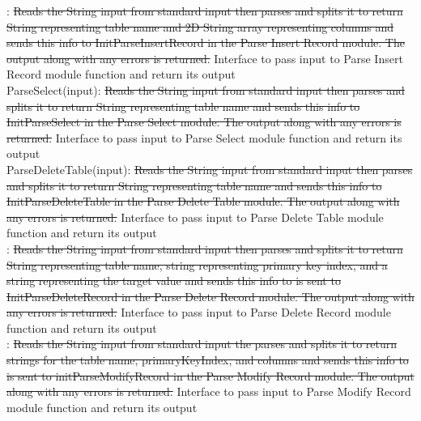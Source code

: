 \documentclass[12pt]{article}
\begin{document}
: \sout{Reads the String input from standard input then parses and splits it to return String representing table name and 2D String array representing columns and sends this info to InitParseInsertRecord in the Parse Insert Record module. The output along with any errors is returned.} {\color{red} Interface to pass input to Parse Insert Record module function and return its output}\\

\noindent ParseSelect(input): \sout{Reads the String input from standard input then parses and splits it to return String representing table name and sends this info to InitParseSelect in the Parse Select module. The output along with any errors is returned.} {\color{red} Interface to pass input to Parse Select module function and return its output}\\

\noindent ParseDeleteTable(input): \sout{Reads the String input from standard input then parses and splits it to return String representing table name and sends this info to InitParseDeleteTable in the Parse Delete Table module. The output along with any errors is returned.} {\color{red} Interface to pass input to Parse Delete Table module function and return its output}\\

: \sout{Reads the String input from standard input then parses and splits it to return String representing table name, string representing primary key index, and a string representing the target value and sends this info to is sent to InitParseDeleteRecord in the Parse Delete Record module. The output along with any errors is returned.} {\color{red} Interface to pass input to Parse Delete Record module function and return its output}\\ 

: \sout{Reads the String input from standard input the parses and splits it to return strings for the table name, primaryKeyIndex, and columns and sends this info to is sent to initParseModifyRecord in the Parse Modify Record module. The output along with any errors is returned.} {\color{red} Interface to pass input to Parse Modify Record module function and return its output}\\

\end{document}
